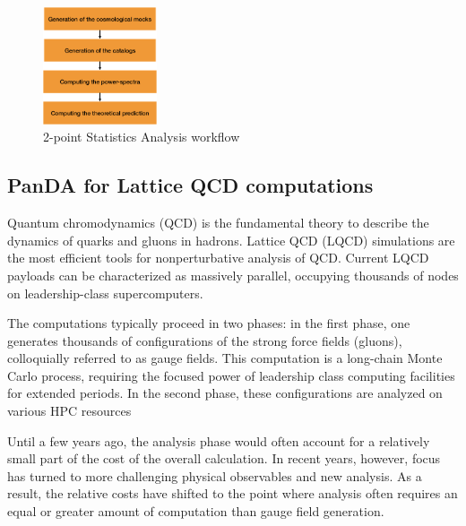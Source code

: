 \documentclass{webofc}
\begin{document}
\begin{figure}
  \centering
  \includegraphics[width=0.30\textwidth]{figures/LSST_2point_statistics.png}
  \caption{2-point Statistics Analysis workflow}
  \label{fig:lsst_desc_2pt_stats}
\end{figure}


\subsection{PanDA for Lattice QCD computations} \label{section_lqcd}

Quantum chromodynamics (QCD) is the fundamental theory to describe the dynamics of quarks and gluons in hadrons.
Lattice QCD (LQCD) simulations are the most efficient tools for nonperturbative analysis of QCD.
Current LQCD payloads can be characterized as massively parallel, occupying thousands of nodes on leadership-class supercomputers. 

The computations typically proceed in two phases: in the first phase, one generates thousands of configurations of the strong force fields (gluons), colloquially referred to as gauge fields. 
This computation is a long-chain Monte Carlo process, requiring the focused power of leadership class computing facilities for extended periods. In the second phase, these configurations are analyzed on various HPC resources~\cite{Babich:2011np}

Until a few years ago, the analysis phase would often account for a relatively small part of the cost of the overall calculation. In recent years, however, focus has turned to more challenging physical observables and new analysis. As a result, the relative costs have shifted to the point where analysis often requires an equal or greater amount of computation than gauge field generation.
\end{document}
